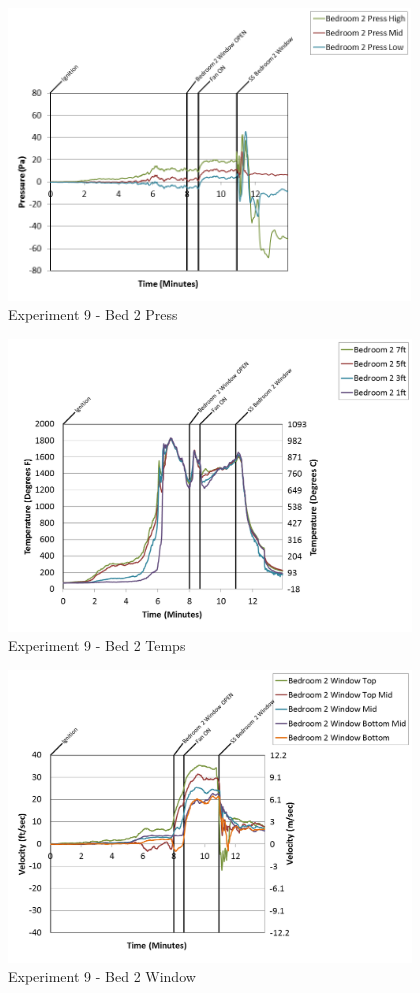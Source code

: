 \documentclass{article}
\begin{document}
\begin{appendices}
\begin{figure}[h!]
	\centering
	\includegraphics[height=3.05in]{0_Images/Results_Charts/Exp_9_Charts/Bed2Press.png}
	\caption{Experiment 9 - Bed 2 Press}
\end{figure}

\clearpage

\begin{figure}[h!]
	\centering
	\includegraphics[height=3.05in]{0_Images/Results_Charts/Exp_9_Charts/Bed2Temps.png}
	\caption{Experiment 9 - Bed 2 Temps}
\end{figure}


\begin{figure}[h!]
	\centering
	\includegraphics[height=3.05in]{0_Images/Results_Charts/Exp_9_Charts/Bed2Window.png}
	\caption{Experiment 9 - Bed 2 Window}
\end{figure}


\end{appendices}
\end{document}
